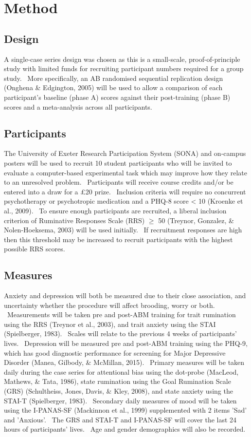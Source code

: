 \documentclass[man,a4paper]{apa6}
\begin{document}
\section{Method}
\subsection{Design}
A single-case series design was chosen as this is a small-scale, proof-of-principle study with limited funds for recruiting participant numbers required for a group study. \ More specifically, an AB randomised sequential replication design (Onghena \& Edgington, 2005) will be used to allow a comparison of each participant's baseline (phase A) scores against their post-training (phase B) scores and a meta-analysis across all participants.

\subsection{Participants}
The University of Exeter Research Participation System (SONA) and on-campus posters will be used to recruit 10 student participants who will be invited to evaluate a computer-based experimental task which may improve how they relate to an unresolved problem. \ Participants will receive course credits and/or be entered into a draw for a {\pounds}20 prize. \ Inclusion criteria will require no concurrent psychotherapy or psychotropic medication and a PHQ-8 score {\textless} 10 (Kroenke et al., 2009). \ To ensure enough participants are recruited, a liberal inclusion criterion of Ruminative Responses Scale (RRS) ${\geq}$ 50 (Treynor, Gonzalez, \& Nolen-Hoeksema, 2003) will be used initially. \ If recruitment responses are high then this threshold may be increased to recruit participants with the highest possible RRS scores.

\subsection{Measures}
Anxiety and depression will both be measured due to their close association, and uncertainty whether the procedure will affect brooding, worry or both. \ Measurements will be taken pre and post-ABM training for trait rumination using the RRS (Treynor et al., 2003), and trait anxiety using the STAI (Spielberger, 1983). \ Scales will relate to the previous 4 weeks of participants' lives. \ Depression will be measured pre and post-ABM training using the PHQ-9, which has good diagnostic performance for screening for Major Depressive Disorder (Manea, Gilbody, \& McMillan, 2015). \ Primary measures will be taken daily during the case series for attentional bias using the dot-probe (MacLeod, Mathews, \& Tata, 1986), state rumination using the Goal Rumination Scale (GRS) (Schultheiss, Jones, Davis, \& Kley, 2008), and state anxiety using the STAI-T (Spielberger, 1983). \ Secondary daily measures of mood will be taken using the I-PANAS-SF (Mackinnon et al., 1999) supplemented with 2 items 'Sad' and 'Anxious'. \ The GRS and STAI-T and I-PANAS-SF will cover the last 24 hours of participants' lives. \ Age and gender demographics will also be recorded.
\end{document}
